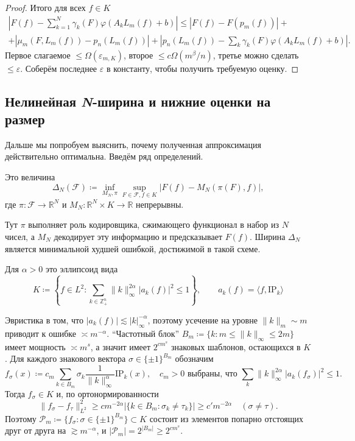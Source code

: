 \documentclass[../NDCNNAI_main.tex]{subfiles}
\begin{document}
\begin{proof}
  Итого для всех $f \in K$
  \begin{multline*}
    \left| F(f) - \sum_{k=1}^{N} \gamma_k(F) \varphi(A_k L_m(f) + b) \right| \le |F(f) - F(p_m(f))| + \\
    + |\mu_m(F, L_m(f)) - p_n(L_m(f))| + \left| p_n(L_m(f)) - \sum_{k} \gamma_k(F) \varphi(A_k L_m(f) + b) \right|.
  \end{multline*}
  Первое слагаемое $\le \Omega(\varepsilon_{m,K})$, второе $\le c\Omega(m^\beta / n)$, третье можно сделать $\le \varepsilon$.
  Соберём последнее $\varepsilon$ в константу, чтобы получить требуемую оценку.
\end{proof}

\subsection{Нелинейная \textit{N}-ширина и нижние оценки на размер}
Дальше мы попробуем выяснить, почему полученная аппроксимация действительно оптимальна.
Введём ряд определений.
\begin{definition}
  Это величина
  $$\Delta_N(\mathcal{F}) \coloneq \inf_{M_N, \pi} \sup_{F \in \mathcal{F}, f \in K} |F(f) - M_N(\pi(F), f)|,$$
  где $\pi\colon \mathcal{F} \to \mathbb{R}^N$ и $M_N\colon \mathbb{R}^N \times K \to \mathbb{R}$ непрерывны.
\end{definition}
Тут $\pi$ выполняет роль кодировщика, сжимающего функционал в набор из $N$ чисел, а $M_N$ декодирует эту информацию и предсказывает $F(f)$.
Ширина $\Delta_N$ является минимальной худшей ошибкой, достижимой в такой схеме.
\begin{definition}
  Для $\alpha > 0$ это эллипсоид вида
  $$K \coloneq \left\{ f \in L^2 : \sum_{k \in \mathbb{Z}_+^n} \|k\|_\infty^{2\alpha} |a_k(f)|^2 \le 1 \right\}, \qquad a_k(f) = \langle f, \mathrm{IP}_k \rangle$$
\end{definition}
Эвристика в том, что $|a_k(f)| \lesssim |k|_\infty^{-\alpha}$, поэтому усечение на уровне $\|k\|_m \sim m$ приводит к ошибке $\asymp m^{-\alpha}$.
``Частотный блок'' $B_m \coloneq \{k : m \le \|k\|_\infty \le 2m\}$ имеет мощность $\asymp m^s$, а значит имеет $2^{cm^s}$ знаковых шаблонов, остающихся в $K$.
Для каждого знакового вектора $\sigma \in \{\pm 1\}^{B_m}$ обозначим
$$f_\sigma(x) \coloneq c_m \sum_{k \in B_m} \sigma_k \frac{1}{\|k\|_\infty^\alpha} \mathrm{IP}_k(x), \quad c_m > 0 \text{ выбраны, что } \sum_k \|k\|_\infty^{2\alpha} |a_k(f_\sigma)|^2 \le 1.$$
Тогда $f_\sigma \in K$ и, по ортонормированности
$$\|f_\sigma - f_\tau\|_{L^2}^2 \ge c m^{-2\alpha} |\{ k \in B_m : \sigma_k \neq \tau_k \}| \ge c' m^{-2\alpha} \quad (\sigma \neq \tau).$$
Поэтому $\mathcal{P}_m \coloneq \{ f_\sigma : \sigma \in \{\pm 1\}^{B_m} \} \subset K$ состоит из элементов попарно отстоящих друг от друга на $\gtrsim m^{-\alpha}$, и $|\mathcal{P}_m| = 2^{|B_m|} \geq 2^{c m^s}$.
\end{document}
